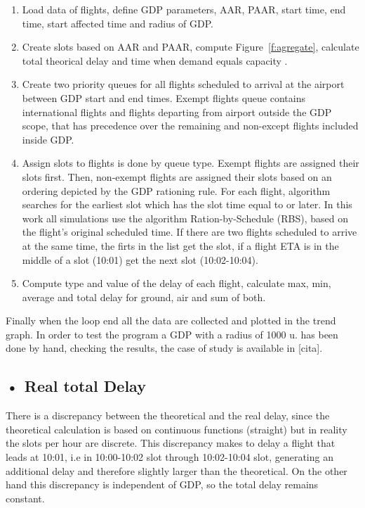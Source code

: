 \documentclass[final,1p]{elsarticle}
\begin{document}
\begin{enumerate}[1.]
\item Load data of flights, define GDP parameters, AAR, PAAR, start time, end time, start affected time and radius of GDP.
\item Create slots based on AAR and PAAR, compute Figure~\ref{f:agregate}, calculate total theorical delay and time when demand equals capacity .
\item Create two priority queues for all flights scheduled to arrival at the airport between GDP start and end times. Exempt flights queue contains international flights and flights departing from airport outside the GDP scope, that has precedence over the remaining and non-except flights included inside GDP. 
\item Assign slots to flights is done by queue type. Exempt flights are assigned their slots first. Then, non-exempt flights are assigned their slots based on an ordering depicted by the GDP rationing rule. For each flight, algorithm searches for the earliest slot which has the slot time equal to or later. In this work all simulations use the algorithm Ration-by-Schedule (RBS), based on the flight's original scheduled time. If there are two flights scheduled to arrive at the same time, the firts in the list get the slot, if a flight ETA is in the middle of a slot (10:01) get the next slot (10:02-10:04).
\item Compute type and value of the delay of each flight, calculate max, min, average and total delay for ground, air and sum of both.
\end{enumerate}

Finally when the loop end all the data are collected and plotted in the trend graph. In order to test the program a GDP with a radius of 1000 u. has been done by hand, checking the results, the case of study is available in [cita].

\subsection{• Real total Delay}
\label{subSec:procedure}

There is a discrepancy between the theoretical and the real delay, since the theoretical calculation is based on continuous functions (straight) but in reality the slots per hour are discrete. This discrepancy makes to delay a flight that leads at 10:01, i.e in 10:00-10:02 slot through 10:02-10:04 slot, generating an additional delay and therefore slightly larger than the theoretical. On the other hand this discrepancy is independent of GDP, so the total delay remains constant.
\end{document}
